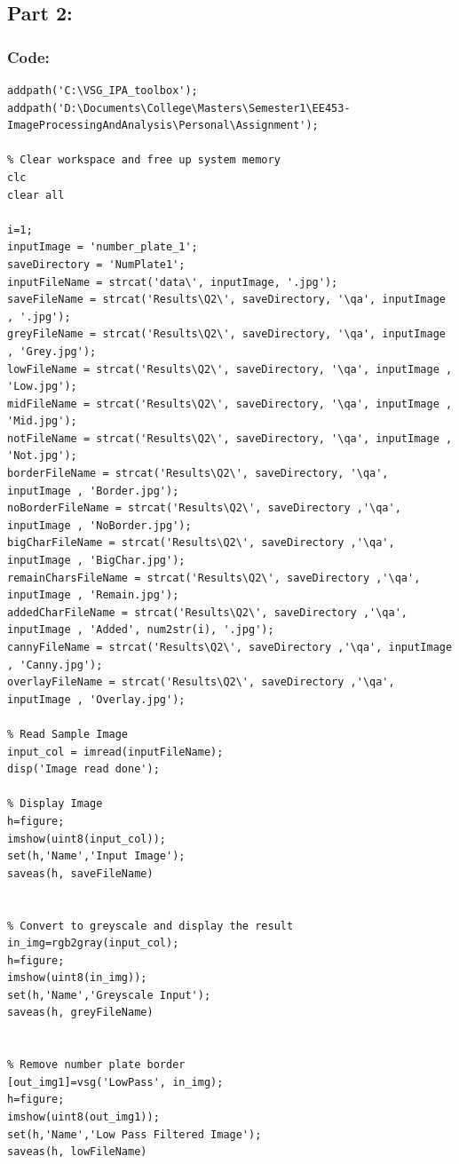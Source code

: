 \documentclass[a4paper]{article}
\begin{document}
	\subsection{Part 2:}
	\subsubsection{Code:}
\begin{lstlisting}[caption={Part 2 a}]
	% Setup Paths to VSG Toolbox and Local Data
addpath('C:\VSG_IPA_toolbox');
addpath('D:\Documents\College\Masters\Semester1\EE453-ImageProcessingAndAnalysis\Personal\Assignment');

% Clear workspace and free up system memory
clc
clear all

i=1;
inputImage = 'number_plate_1';
saveDirectory = 'NumPlate1';
inputFileName = strcat('data\', inputImage, '.jpg');
saveFileName = strcat('Results\Q2\', saveDirectory, '\qa', inputImage , '.jpg');
greyFileName = strcat('Results\Q2\', saveDirectory, '\qa', inputImage , 'Grey.jpg');
lowFileName = strcat('Results\Q2\', saveDirectory, '\qa', inputImage , 'Low.jpg');
midFileName = strcat('Results\Q2\', saveDirectory, '\qa', inputImage , 'Mid.jpg');
notFileName = strcat('Results\Q2\', saveDirectory, '\qa', inputImage , 'Not.jpg');
borderFileName = strcat('Results\Q2\', saveDirectory, '\qa', inputImage , 'Border.jpg');
noBorderFileName = strcat('Results\Q2\', saveDirectory ,'\qa', inputImage , 'NoBorder.jpg');
bigCharFileName = strcat('Results\Q2\', saveDirectory ,'\qa', inputImage , 'BigChar.jpg');
remainCharsFileName = strcat('Results\Q2\', saveDirectory ,'\qa', inputImage , 'Remain.jpg');
addedCharFileName = strcat('Results\Q2\', saveDirectory ,'\qa', inputImage , 'Added', num2str(i), '.jpg');
cannyFileName = strcat('Results\Q2\', saveDirectory ,'\qa', inputImage , 'Canny.jpg');
overlayFileName = strcat('Results\Q2\', saveDirectory ,'\qa', inputImage , 'Overlay.jpg');

% Read Sample Image
input_col = imread(inputFileName);
disp('Image read done');

% Display Image
h=figure;
imshow(uint8(input_col));
set(h,'Name','Input Image');
saveas(h, saveFileName)


% Convert to greyscale and display the result
in_img=rgb2gray(input_col);
h=figure;
imshow(uint8(in_img));
set(h,'Name','Greyscale Input');
saveas(h, greyFileName)


% Remove number plate border
[out_img1]=vsg('LowPass', in_img);
h=figure;
imshow(uint8(out_img1));
set(h,'Name','Low Pass Filtered Image');
saveas(h, lowFileName)


\end{lstlisting}
\end{document}
